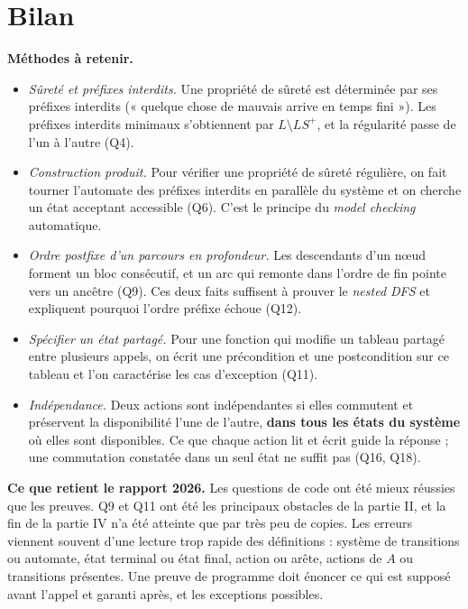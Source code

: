 \documentclass[11pt,a4paper]{article}
\providecommand{\tightlist}{\setlength{\itemsep}{0pt}\setlength{\parskip}{0pt}}
\begin{document}
\hypertarget{bilan}{%
\section{Bilan}\label{bilan}}

\textbf{Méthodes à retenir.}

\begin{itemize}
\tightlist
\item
  \emph{Sûreté et préfixes interdits.} Une propriété de sûreté est déterminée par ses préfixes interdits (« quelque chose de mauvais arrive en temps fini »). Les préfixes interdits minimaux s'obtiennent par \(L\setminus LS^+\), et la régularité passe de l'un à l'autre (Q4).
\item
  \emph{Construction produit.} Pour vérifier une propriété de sûreté régulière, on fait tourner l'automate des préfixes interdits en parallèle du système et on cherche un état acceptant accessible (Q6). C'est le principe du \emph{model checking} automatique.
\item
  \emph{Ordre postfixe d'un parcours en profondeur.} Les descendants d'un nœud forment un bloc consécutif, et un arc qui remonte dans l'ordre de fin pointe vers un ancêtre (Q9). Ces deux faits suffisent à prouver le \emph{nested DFS} et expliquent pourquoi l'ordre préfixe échoue (Q12).
\item
  \emph{Spécifier un état partagé.} Pour une fonction qui modifie un tableau partagé entre plusieurs appels, on écrit une précondition et une postcondition sur ce tableau et l'on caractérise les cas d'exception (Q11).
\item
  \emph{Indépendance.} Deux actions sont indépendantes si elles commutent et préservent la disponibilité l'une de l'autre, \textbf{dans tous les états du système} où elles sont disponibles. Ce que chaque action lit et écrit guide la réponse ; une commutation constatée dans un seul état ne suffit pas (Q16, Q18).
\end{itemize}

\textbf{Ce que retient le rapport 2026.} Les questions de code ont été mieux réussies que les preuves. Q9 et Q11 ont été les principaux obstacles de la partie II, et la fin de la partie IV n'a été atteinte que par très peu de copies. Les erreurs viennent souvent d'une lecture trop rapide des définitions : système de transitions ou automate, état terminal ou état final, action ou arête, actions de \(A\) ou transitions présentes. Une preuve de programme doit énoncer ce qui est supposé avant l'appel et garanti après, et les exceptions possibles.
\end{document}
